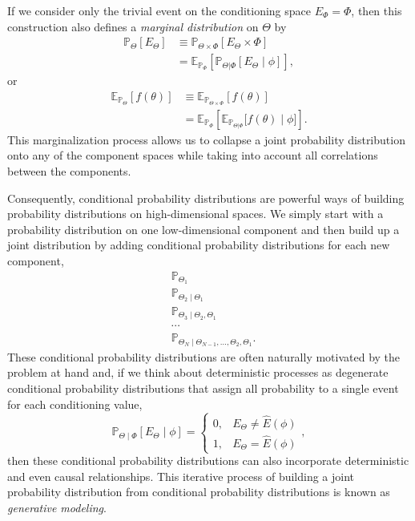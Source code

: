 \documentclass[11pt, oneside]{article}
\newcommand{\PP}{ \mathbb{P} }
\newcommand{\EE}{ \mathbb{E} }
\begin{document}
If we consider only the trivial event on the conditioning space $E_{\Phi} 
= \Phi$, then this construction also defines a  \emph{marginal distribution} 
on $\Theta$ by
%
\begin{align*}
\PP_{\Theta} \! \left[ E_{\Theta} \right]
&\equiv
\PP_{\Theta \times \Phi} \! \left[ E_{\Theta} \times \Phi \right] \\
&=
\mathbb{E}_{\PP_{\Phi}} \! \left[  
\PP_{\Theta|\Phi} \! \left[ E_{\Theta} \mid \phi \right]
\right],
\end{align*}
or
%
\begin{align*}
\EE_{\PP_{\Theta}} \! \left[ f \! \left( \theta \right) \right]
&\equiv
\EE_{\PP_{\Theta \times \Phi}} \! \left[ f \! \left( \theta \right) \right] \\
&=
\mathbb{E}_{\PP_{\Phi}} \! \left[  
\EE_{\PP_{\Theta|\Phi}} \! \Big[ 
f \! \left( \theta \right) \mid \phi 
\Big]
\right].
\end{align*}
%
This marginalization process allows us to collapse a joint probability 
distribution onto any of the component spaces while taking into account 
all correlations between the components.

Consequently, conditional probability distributions are powerful ways of
building probability distributions on high-dimensional spaces.  We simply 
start with a probability distribution on one low-dimensional component and 
then build up a joint distribution by adding conditional probability distributions 
for each new component,
%
\begin{align*}
& \PP_{\Theta_{1}} \\
& \PP_{\Theta_{2} \mid \Theta_{1}} \\
& \PP_{\Theta_{3} \mid \Theta_{2}, \Theta_{1}} \\
& \cdots \\
& \PP_{\Theta_{N} \mid \Theta_{N - 1}, \ldots, \Theta_{2}, \Theta_{1}}.
\end{align*}
%
These conditional probability distributions are often naturally motivated by
the problem at hand and, if we think about deterministic processes as 
degenerate conditional probability distributions that assign all probability 
to a single event for each conditioning value,
%
\begin{equation*}
\PP_{\Theta \mid \Phi} \! \left[ E_{\Theta} \mid \phi \right]
= 
\left\{
\begin{array}{rr}
0, & E_{\Theta} \ne \hat{E} \! \left( \phi \right) \\
1, & E_{\Theta} = \hat{E} \! \left( \phi \right)
\end{array}
\right.,
\end{equation*}
%
then these conditional probability distributions can also incorporate 
deterministic and even causal relationships.  This iterative process 
of building a joint probability distribution from conditional probability 
distributions is known as \emph{generative modeling}.
\end{document}
